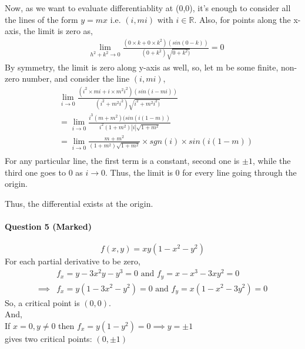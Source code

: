 \documentclass[20pt,a4paper]{extarticle} %
\theoremstyle{definition}
\theoremstyle{definition}
\begin{document}
\newpage

Now, as we want to evaluate differentiablity at (0,0), it's enough to consider all the lines of the
form $y=mx$ i.e. $(i,mi) \text{ with } i \in \mathbb{R}$. Also, for points along the x-axis, the limit is zero as,
\begin{equation*}
	\begin{split}
		&\lim_{h^2+k^2 \to 0} \frac{(0 \times k+0 \times k^2)(sin(0-k))}{(0+k^2)\sqrt{0+k^2)}}=0
	\end{split}
\end{equation*}
By symmetry, the limit is zero along y-axis as well, so, let m be some finite, non-zero number,
and consider the line $(i,mi)$,
\begin{equation*}
	\begin{split}
		&\lim_{i \to 0} \frac{(i^2 \times mi+i \times m^2i^2)
		(sin(i-mi))}{(i^2+m^2i^2)\sqrt{i^2+m^2i^2)}}\\
		&=\lim_{i \to 0} \frac{i^3(m+m^2)(sin(i(1-m))}{i^2(1+m^2) |i|\sqrt{1+m^2}}\\
		&=\lim_{i \to 0} \frac{m+m^2}{(1+m^2) \sqrt{1+m^2}} \times sgn(i) \times sin(i(1-m)) \\
	\end{split}
\end{equation*}
For any particular line, the first term is a constant, second one is $\pm 1$, while the third one goes
to $0$ as $i \to 0$. Thus, the limit is $0$ for every line going through the origin.

Thus, the differential exists at the origin.


\newpage


\paragraph{Question 5 (Marked)}
\[ f(x,y)=xy(1-x^2-y^2) \]
For each partial derivative to be zero,
\begin{align*}
	& f_x=y-3x^2y-y^3=0 \text{ and }f_y=x-x^3-3xy^2=0 \\
	\implies & f_x=y(1-3x^2-y^2)=0 \text{ and } f_y=x(1-x^2-3y^2)=0
\end{align*}
So, a critical point is $(0,0)$.\\

And,\\
If $x=0,y\neq0$ then $f_x=y(1-y^2)=0 \implies y= \pm 1$\\
gives two critical points: $(0,\pm 1)$\\
\end{document}
